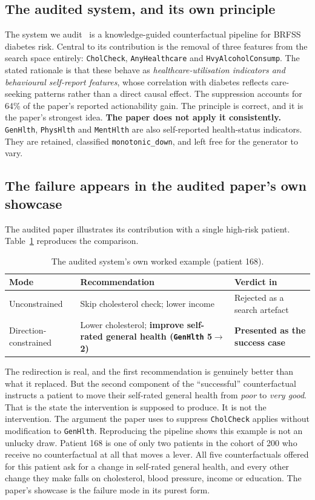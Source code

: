 \documentclass[conference]{IEEEtran}
\begin{document}
\subsection{The audited system, and its own principle}
The system we audit~\cite{thieu2026} is a knowledge-guided counterfactual pipeline for BRFSS diabetes risk. Central to its contribution is the removal of three features from the search space entirely: \texttt{CholCheck}, \texttt{AnyHealthcare} and \texttt{HvyAlcoholConsump}. The stated rationale is that these behave as \emph{healthcare-utilisation indicators and behavioural self-report features}, whose correlation with diabetes reflects care-seeking patterns rather than a direct causal effect. The suppression accounts for 64\% of the paper's reported actionability gain. The principle is correct, and it is the paper's strongest idea. \textbf{The paper does not apply it consistently.} \texttt{GenHlth}, \texttt{PhysHlth} and \texttt{MentHlth} are also self-reported health-status indicators. They are retained, classified \texttt{monotonic\_down}, and left free for the generator to vary.

\subsection{The failure appears in the audited paper's own showcase}
The audited paper illustrates its contribution with a single high-risk patient. Table~\ref{tab:patient168} reproduces the comparison.

\begin{table}[t]
\caption{The audited system's own worked example (patient 168).}
\label{tab:patient168}
\centering
\footnotesize
\begin{tabular}{@{}p{1.4cm}p{3.1cm}p{2.6cm}@{}}
\toprule
\textbf{Mode} & \textbf{Recommendation} & \textbf{Verdict in \cite{thieu2026}} \\
\midrule
Unconstrained & Skip cholesterol check; lower income & Rejected as a search artefact \\
Direction-constrained & Lower cholesterol; \textbf{improve self-rated general health (\texttt{GenHlth} 5$\rightarrow$2)} & \textbf{Presented as the success case} \\
\bottomrule
\end{tabular}
\end{table}

The redirection is real, and the first recommendation is genuinely better than what it replaced. But the second component of the ``successful'' counterfactual instructs a patient to move their self-rated general health from \emph{poor} to \emph{very good}. That is the state the intervention is supposed to produce. It is not the intervention. The argument the paper uses to suppress \texttt{CholCheck} applies without modification to \texttt{GenHlth}. Reproducing the pipeline shows this example is not an unlucky draw. Patient 168 is one of only two patients in the cohort of 200 who receive no counterfactual at all that moves a lever. All five counterfactuals offered for this patient ask for a change in self-rated general health, and every other change they make falls on cholesterol, blood pressure, income or education. The paper's showcase is the failure mode in its purest form.
\end{document}
